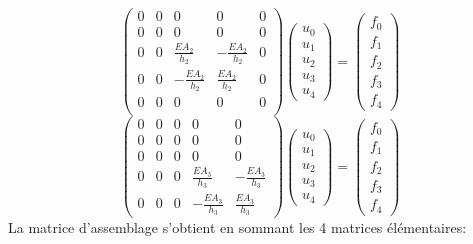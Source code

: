 \documentclass[a4paper]{article}
\begin{document}
\[\left(\begin{array}{ccccc} 
0&0&0&0&0\\
0&0&0&0&0\\
0&0&\frac{EA_2}{h_2}&-\frac{EA_2}{h_2}&0\\0&0&-\frac{EA_2}{h_2}&\frac{EA_2}{h_2}&0\\
0&0&0&0&0\\
\end{array}\right) \left(\begin{array}{l} 
u _{0}\\u _{1}\\u _{2}\\u _{3}\\u _{4}
\end{array}\right)=\left(\begin{array}{c} 
f_{0}\\f_{1}\\f_{2}\\f_{3}\\f_{4}
\end{array}\right)
\]
\[\left(\begin{array}{ccccc} 
0&0&0&0&0\\
0&0&0&0&0\\
0&0&0&0&0\\
0&0&0&\frac{EA_3}{h_3}&-\frac{EA_3}{h_3}\\0&0&0&-\frac{EA_3}{h_3}&\frac{EA_3}{h_3}
\end{array}\right) \left(\begin{array}{l} 
u _{0}\\u _{1}\\u _{2}\\u _{3}\\u _{4}
\end{array}\right)=\left(\begin{array}{c} 
f_{0}\\f_{1}\\f_{2}\\f_{3}\\f_{4}
\end{array}\right)
\]
La matrice d'assemblage s'obtient en sommant les 4 matrices élémentaires:
\end{document}
